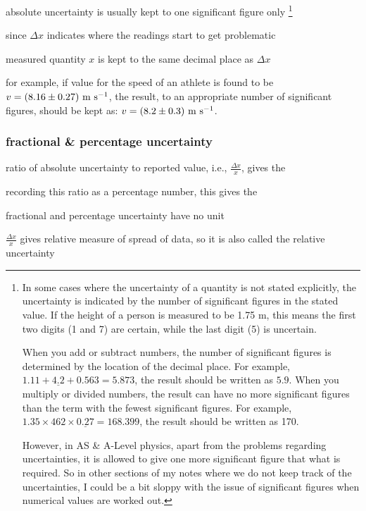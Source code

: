 \cmt absolute uncertainty is usually kept to one significant figure only
\footnote{In some cases where the uncertainty of a quantity is not stated explicitly, the uncertainty is indicated by the number of significant figures in the stated value. If the height of a person is measured to be 1.75 m, this means the first two digits (1 and 7) are certain, while the last digit (5) is uncertain.
	
	When you add or subtract numbers, the number of significant figures is determined by the location of the decimal place. For example, $1.11+\underline{4.2}+0.563=5.873$, the result should be written as $5.9$. When you multiply or divided numbers, the result can have no more significant figures than the term with the fewest significant figures. For example, $1.35\times462\times\underline{0.27} = 168.399$, the result should be written as 170.
	
	However, in AS \& A-Level physics, apart from the problems regarding uncertainties, it is allowed to give one more significant figure that what is required. So in other sections of my notes where we do not keep track of the uncertainties, I could be a bit sloppy with the issue of significant figures when numerical values are worked out.}

since $\Delta x$ indicates where the readings start to get problematic

measured quantity $x$ is kept to the same decimal place as $\Delta x$

for example, if value for the speed of an athlete is found to be $v=(8.16\pm0.27)\text{ m s$^{-1}$}$, the result, to an appropriate number of significant figures, should be kept as: $v=(8.2\pm0.3) \text{ m s$^{-1}$}$.



\subsubsection{fractional \& percentage uncertainty}

ratio of absolute uncertainty to reported value, i.e., $\frac{\Delta x}{x}$, gives the 

recording this ratio as a percentage number, this gives the 

\cmt fractional and percentage uncertainty have no unit

\cmt $\frac{\Delta x}{x}$ gives relative measure of spread of data, so it is also called the relative uncertainty

